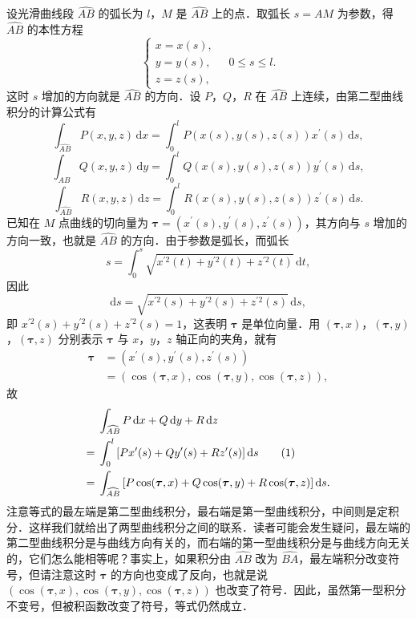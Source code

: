 设光滑曲线段 $\widehat{AB}$ 的弧长为 $l$，$M$ 是 $\widehat{AB}$ 上的点．取弧长 $s=\widehat{AM}$ 为参数，得 $\widehat{AB}$ 的本性方程
\[
\begin{cases}
x=x(s),\\
y=y(s),\\
z=z(s),
\end{cases}
\quad 0\leqslant s\leqslant l.
\]
这时 $s$ 增加的方向就是 $\widehat{AB}$ 的方向．设 $P$，$Q$，$R$ 在 $\widehat{AB}$ 上连续，由第二型曲线积分的计算公式有
\[
\int_{\widehat{AB}}P(x,y,z)\,\mathrm{d}x=\int_{0}^{l}P(x(s),y(s),z(s))x^{\prime}(s)\,\mathrm{d}s,
\]
\[
\int_{\widehat{AB}}Q(x,y,z)\,\mathrm{d}y=\int_{0}^{l}Q(x(s),y(s),z(s))y^{\prime}(s)\,\mathrm{d}s,
\]
\[
\int_{\widehat{AB}}R(x,y,z)\,\mathrm{d}z=\int_{0}^{l}R(x(s),y(s),z(s))z^{\prime}(s)\,\mathrm{d}s.
\]
已知在 $M$ 点曲线的切向量为 $\bm{\tau}=(x^{\prime}(s),y^{\prime}(s),z^{\prime}(s))$，其方向与 $s$ 增加的方向一致，也就是 $\widehat{AB}$ 的方向．由于参数是弧长，而弧长
\[
s=\int_{0}^{s}\sqrt{x^{\prime2}(t)+y^{\prime2}(t)+z^{\prime2}(t)}\,\mathrm{d}t,
\]
因此
\[
\mathrm{d}s=\sqrt{x^{\prime2}(s)+y^{\prime2}(s)+z^{\prime2}(s)}\,\mathrm{d}s,
\]
即 $x^{\prime2}(s)+y^{\prime2}(s)+z^{\prime2}(s)=1$，这表明 $\bm{\tau}$ 是单位向量．用 $(\bm{\tau},x)$，$(\bm{\tau},y)$，$(\bm{\tau},z)$ 分别表示 $\bm{\tau}$ 与 $x$，$y$，$z$ 轴正向的夹角，就有
\[
\begin{aligned}
\bm{\tau}&=\left(x^{\prime}(s),y^{\prime}(s),z^{\prime}(s)\right)\\
&=\left(\cos(\bm{\tau},x),\cos(\bm{\tau},y),\cos(\bm{\tau},z)\right),
\end{aligned}
\]
故
\begin{align}
&\int_{\widehat{AB}}P\,\mathrm{d}x+Q\,\mathrm{d}y+R\,\mathrm{d}z\notag\\
={}&\int_{0}^{l}\left[Px^{\prime}(s)+Qy^{\prime}(s)+Rz^{\prime}(s)\right]\mathrm{d}s\tag{1}\label{eq:21-2-1}\\
={}&\int_{\widehat{AB}}\left[P\cos(\boldsymbol{\tau},x)+Q\cos(\boldsymbol{\tau},y)+R\cos(\boldsymbol{\tau},z)\right]\mathrm{d}s.\notag
\end{align}
注意等式的最左端是第二型曲线积分，最右端是第一型曲线积分，中间则是定积分．这样我们就给出了两型曲线积分之间的联系．读者可能会发生疑问，最左端的第二型曲线积分是与曲线方向有关的，而右端的第一型曲线积分是与曲线方向无关的，它们怎么能相等呢？事实上，如果积分由 $\widehat{AB}$ 改为 $\widehat{BA}$，最左端积分改变符号，但请注意这时 $\bm{\tau}$ 的方向也变成了反向，也就是说 $\left(\cos(\bm{\tau},x),\cos(\bm{\tau},y),\cos(\bm{\tau},z)\right)$ 也改变了符号．因此，虽然第一型积分不变号，但被积函数改变了符号，等式仍然成立．

